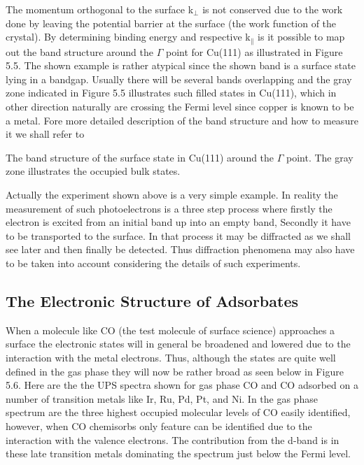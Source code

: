 \vspace{1cm}

 The momentum orthogonal to the surface k$_{\perp}$ is not conserved   due to the work done by leaving the potential barrier at the surface (the work function of the crystal).  By determining binding energy and respective k$_\parallel$ is it possible to map out the band structure around the  $\Gamma$ point for Cu(111) as illustrated in Figure 5.5. The shown example is rather atypical since the shown band is a surface state lying in a bandgap. Usually there will be several bands overlapping and the gray zone indicated in Figure 5.5 illustrates such  filled states in Cu(111), which in other direction naturally are crossing the Fermi level since copper is known to be a metal. Fore more detailed description of the band structure and how to measure it  we shall refer to \cite{Neddermeyer, Kevan}


\vspace*{11cm}

           The band structure of the surface state in Cu(111) around the $\Gamma$ point. The gray zone illustrates the occupied bulk states.

\vspace{1cm}

Actually the experiment shown above is a very simple example. In reality the measurement of such photoelectrons is a three step process  \cite{Berglund} where firstly the electron is excited from an initial band up into an empty band, Secondly it have to be transported to the surface. In that process it may be diffracted as we shall see later and then  finally be detected. Thus diffraction phenomena may also have to be taken into account considering the details of such experiments.



\subsection{The Electronic Structure of Adsorbates}

When a molecule like CO (the test molecule of surface science) approaches a surface the electronic states will in general be broadened and lowered due to the interaction with the metal electrons. Thus, although the states are quite well defined in the gas phase they will now be rather broad as seen below in Figure 5.6. Here are the  the UPS spectra shown for gas phase CO and CO adsorbed on a number of transition metals like Ir, Ru, Pd, Pt, and Ni. In the gas phase spectrum are the three highest occupied molecular levels of CO easily identified, however, when CO chemisorbs only feature can be identified due to the interaction with the valence electrons.  The contribution from the d-band is  in these late transition metals dominating the spectrum just below the Fermi level.

